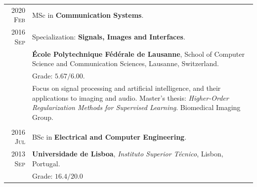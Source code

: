 \documentclass[a4paper,11pt]{article}
\begin{document}
      \begin{tabular}{r|p{13cm}}

        \textsc{2020 Feb}  &
        MSc in \textbf{Communication Systems}. \\
        \textsc{2016 Sep} & Specialization: \textbf{Signals, Images and Interfaces}. \\
        & \footnotesize{\textbf{École Polytechnique Fédérale de Lausanne}, School of Computer Science and Communication Sciences, Lausanne, Switzerland.} \\
        & \footnotesize{
        Grade: $\bm{5.67/6.00}$.} \\
        & \footnotesize{Focus on signal processing and artificial intelligence, and their applications to imaging and audio. Master's thesis: \emph{Higher-Order Regularization Methods for Supervised Learning}. Biomedical Imaging Group.} \\
        \multicolumn{2}{c}{} \\

        \textsc{\phantom{5}2016 Jul} &
        BSc in \textbf{Electrical and Computer Engineering}. \\
        \textsc{2013 Sep} &  \footnotesize{\textbf{Universidade de Lisboa}, \emph{Instituto Superior Técnico}, Lisbon, Portugal.} \\
        & \footnotesize{Grade: $\bm{16.4/20.0}$}
      \end{tabular}


  \vspace{25pt}
\end{document}
